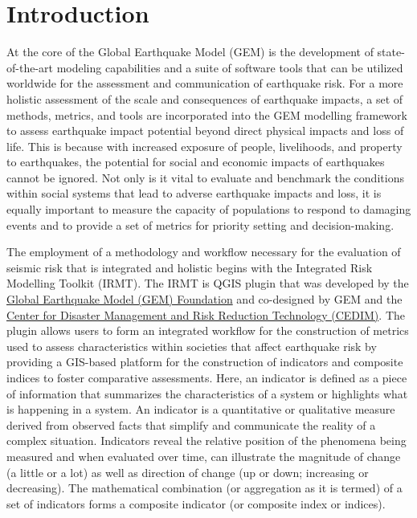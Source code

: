 \chapter{Introduction}
At the core of the Global Earthquake Model (GEM) is the development of
state-of-the-art modeling capabilities and a suite of software tools that can
be utilized worldwide for the assessment and communication of earthquake risk.
For a more holistic assessment of the scale and consequences of earthquake
impacts, a set of methods, metrics, and tools are incorporated into the GEM
modelling framework to assess earthquake impact potential beyond direct
physical impacts and loss of life. This is because with increased exposure of
people, livelihoods, and property to earthquakes, the potential for social and
economic impacts of earthquakes cannot be ignored. Not only is it vital to
evaluate and benchmark the conditions within social systems that lead to
adverse earthquake impacts and loss, it is equally important to measure the
capacity of populations to respond to damaging events and to provide a set of
metrics for priority setting and decision-making.

The employment  of a methodology and workflow necessary for the evaluation of
seismic risk that is integrated and holistic begins with the Integrated Risk
Modelling Toolkit (IRMT). The IRMT is QGIS plugin that was developed by the
\href{www.globalquakemodel.org}{Global Earthquake Model (GEM) Foundation} and
co-designed by GEM and the \href{www.cedim.de/english/index.php}{Center for
Disaster Management and Risk Reduction Technology (CEDIM)}. The plugin allows
users to form an integrated workflow for the construction of metrics used to
assess characteristics within societies that affect earthquake risk by
providing a GIS-based platform for the construction of indicators and composite
indices to foster comparative assessments. Here, an indicator is defined as a
piece of information that summarizes the characteristics of a system or
highlights what is happening in a system. An indicator is a quantitative or
qualitative measure derived from observed facts that simplify and communicate
the reality of a complex situation. Indicators reveal the relative position of
the phenomena being measured and when evaluated over time, can illustrate the
magnitude of change (a little or a lot) as well as direction of change (up or
down; increasing or decreasing). The mathematical combination (or aggregation
as it is termed) of a set of indicators forms a composite indicator (or
composite index or indices).

